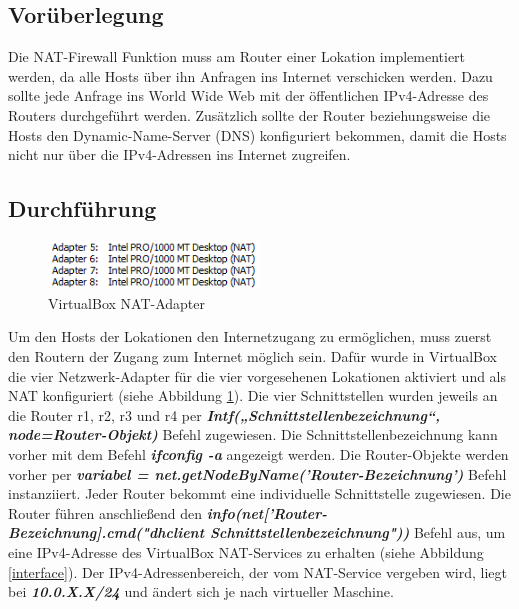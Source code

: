 \documentclass[fontsize=12pt,paper=a4,open=any,parskip=half,
  twoside=false,toc=listof,toc=bibliography,fleqn,leqno,
  captions=nooneline,captions=tableabove,british]{scrbook}
\begin{document}
\subsection{Vorüberlegung}
Die NAT-Firewall Funktion muss am Router einer Lokation implementiert werden, da alle Hosts über ihn Anfragen ins Internet verschicken werden. Dazu sollte jede Anfrage ins World Wide Web mit der öffentlichen IPv4-Adresse des Routers durchgeführt werden. Zusätzlich sollte der Router beziehungsweise die Hosts den Dynamic-Name-Server (DNS) konfiguriert bekommen, damit die Hosts nicht nur über die IPv4-Adressen ins Internet zugreifen.

\subsection{Durchführung}
\begin{figure}
	\vspace{-\baselineskip}
 	\centering
 	\includegraphics[width=0.5\textwidth]{Bilder/adapter}
 	\captionsetup{justification=centering}
 	\caption{VirtualBox NAT-Adapter}
	\label{adapter}
\end{figure}

Um den Hosts der Lokationen den Internetzugang zu ermöglichen, muss zuerst den Routern der Zugang zum Internet möglich sein. Dafür wurde in VirtualBox die vier Netzwerk-Adapter für die vier vorgesehenen Lokationen aktiviert und als NAT konfiguriert (siehe Abbildung \ref{adapter}). 
Die vier Schnittstellen wurden jeweils an die Router r1, r2, r3 und r4 per \textit{\textbf{Intf(„Schnittstellenbezeichnung“, node=Router-Objekt)}} Befehl zugewiesen. Die Schnittstellenbezeichnung kann vorher mit dem Befehl \textit{\textbf{ifconfig -a}} angezeigt werden. Die Router-Objekte werden vorher per \textit{\textbf{variabel = net.getNodeByName('Router-Bezeichnung')}} Befehl instanziiert. Jeder Router bekommt eine individuelle Schnittstelle zugewiesen. Die Router führen anschließend den \textit{\textbf{info(net['Router-Bezeichnung].cmd("dhclient Schnittstellenbezeichnung"))}} Befehl aus, um eine IPv4-Adresse des VirtualBox NAT-Services zu erhalten (siehe Abbildung \ref{interface}). Der IPv4-Adressenbereich, der vom NAT-Service vergeben wird, liegt bei \textit{\textbf{10.0.X.X/24}} und ändert sich je nach virtueller Maschine.
\end{document}
